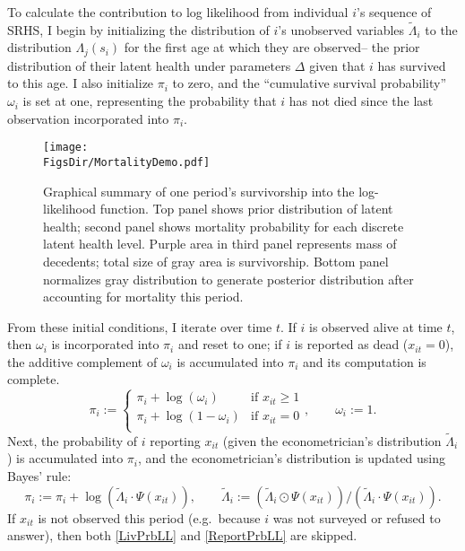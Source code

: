\documentclass[12pt,pdftex,letterpaper]{article}
\newcommand{\Report}{x}
\newcommand{\Age}{j}
\newcommand{\Sex}{s}
\newcommand{\ParamVec}{\Delta}
\newcommand{\CumLivPrb}{\omega}
\newcommand{\HealthDstn}{\Lambda}
\newcommand{\ReportPrb}{\Psi}
\newcommand{\HealthDstnPcvd}{\widetilde{\Lambda}}
\newcommand{\LL}{\pi}
\newcommand{\RootDir}{..}
\newcommand{\FigsDir}{\RootDir/Figures}
\begin{document}
To calculate the contribution to log likelihood from individual $i$'s sequence of SRHS, I begin by initializing the distribution of $i$'s unobserved variables $\HealthDstnPcvd_{i}$ to the distribution $\HealthDstn_{\Age}(\Sex_i)$ for the first age at which they are observed-- the prior distribution of their latent health under parameters $\ParamVec$ given that $i$ has survived to this age.  I also initialize $\LL_i$ to zero, and the ``cumulative survival probability'' $\CumLivPrb_i$ is set at one, representing the probability that $i$ has not died since the last observation incorporated into $\LL_i$.

\begin{figure}[ht!]
	\centering
	\texttt{[image: \\FigsDir/MortalityDemo.pdf]}
	\caption{Graphical summary of one period's survivorship into the log-likelihood function. Top panel shows prior distribution of latent health; second panel shows mortality probability for each discrete latent health level. Purple area in third panel represents mass of decedents; total size of gray area is survivorship. Bottom panel normalizes gray distribution to generate posterior distribution after accounting for mortality this period.}\label{fig:MortalityDemo}
\end{figure}

From these initial conditions, I iterate over time $t$. If $i$ is observed alive at time $t$, then $\CumLivPrb_i$ is incorporated into $\LL_i$ and reset to one; if $i$ is reported as dead ($\Report_{it} = 0$), the additive complement of $\CumLivPrb_{i}$ is accumulated into $\LL_i$ and its computation is complete.
\begin{equation}\label{LivPrbLL}
\LL_i := \begin{cases}
\LL_{i} + \log(\CumLivPrb_i) & \text{if } \Report_{it} \geq 1 \\
\LL_{i} + \log(1 - \CumLivPrb_i) & \text{if } \Report_{it} = 0 \\
\end{cases}, \qquad \CumLivPrb_i := 1.
\end{equation}
Next, the probability of $i$ reporting $\Report_{it}$ (given the econometrician's distribution $\HealthDstnPcvd_{i}$) is accumulated into $\LL_i$, and the econometrician's distribution is updated using Bayes' rule:
\begin{equation}\label{ReportPrbLL}
\LL_i := \LL_i + \log(\HealthDstnPcvd_{i} \cdot \ReportPrb(\Report_{it})), \qquad \HealthDstnPcvd_{i} := (\HealthDstnPcvd_{i} \odot \ReportPrb(\Report_{it})) / (\HealthDstnPcvd_{i} \cdot \ReportPrb(\Report_{it})).
\end{equation}
If $\Report_{it}$ is not observed this period (e.g.\ because $i$ was not surveyed or refused to answer), then both \eqref{LivPrbLL} and \eqref{ReportPrbLL} are skipped.
\end{document}
